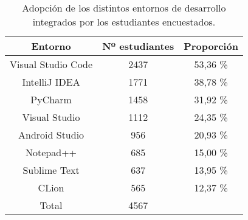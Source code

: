 \begin{table}
    \caption{Adopción de los distintos entornos de desarrollo integrados por los estudiantes encuestados.}
    \label{tab:usoIDEs}
    \centering
    \begin{tabular}{|c|c|c|}
        \textbf{Entorno}   & \textbf{Nº estudiantes} & \textbf{Proporción} \\
        \hline
        Visual Studio Code & 2437                    & 53,36 \%            \\
        \hline
        IntelliJ IDEA      & 1771                    & 38,78 \%            \\
        \hline
        PyCharm            & 1458                    & 31,92 \%            \\
        \hline
        Visual Studio      & 1112                    & 24,35 \%            \\
        \hline
        Android Studio     & 956                     & 20,93 \%            \\
        \hline
        Notepad++          & 685                     & 15,00 \%            \\
        \hline
        Sublime Text       & 637                     & 13,95 \%            \\
        \hline
        CLion              & 565                     & 12,37 \%            \\
        \hline \hline
        Total              & 4567                    &                     \\
        \hline
    \end{tabular}
\end{table}
